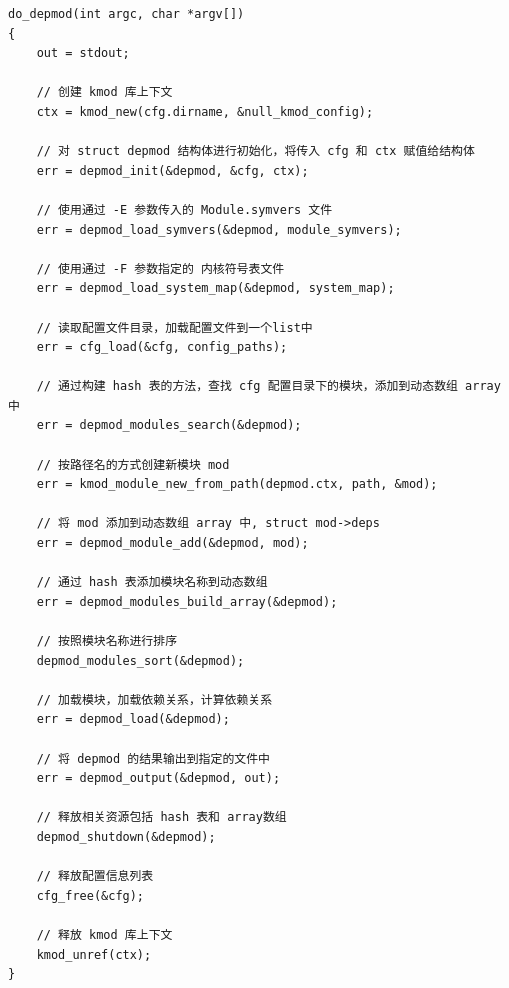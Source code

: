 {\begin{shaded}\begin{verbatim}
do_depmod(int argc, char *argv[])
{
    out = stdout;   

    // 创建 kmod 库上下文
    ctx = kmod_new(cfg.dirname, &null_kmod_config);

    // 对 struct depmod 结构体进行初始化，将传入 cfg 和 ctx 赋值给结构体
    err = depmod_init(&depmod, &cfg, ctx);

    // 使用通过 -E 参数传入的 Module.symvers 文件
    err = depmod_load_symvers(&depmod, module_symvers);

    // 使用通过 -F 参数指定的 内核符号表文件
    err = depmod_load_system_map(&depmod, system_map);

    // 读取配置文件目录，加载配置文件到一个list中
    err = cfg_load(&cfg, config_paths);

    // 通过构建 hash 表的方法，查找 cfg 配置目录下的模块，添加到动态数组 array 中
    err = depmod_modules_search(&depmod);

    // 按路径名的方式创建新模块 mod
    err = kmod_module_new_from_path(depmod.ctx, path, &mod);

    // 将 mod 添加到动态数组 array 中, struct mod->deps
    err = depmod_module_add(&depmod, mod);

    // 通过 hash 表添加模块名称到动态数组 
    err = depmod_modules_build_array(&depmod);

    // 按照模块名称进行排序
    depmod_modules_sort(&depmod);

    // 加载模块，加载依赖关系，计算依赖关系
    err = depmod_load(&depmod);

    // 将 depmod 的结果输出到指定的文件中
    err = depmod_output(&depmod, out);

    // 释放相关资源包括 hash 表和 array数组
    depmod_shutdown(&depmod);

    // 释放配置信息列表
    cfg_free(&cfg);

    // 释放 kmod 库上下文
    kmod_unref(ctx);
}
\end{verbatim}\end{shaded}}
